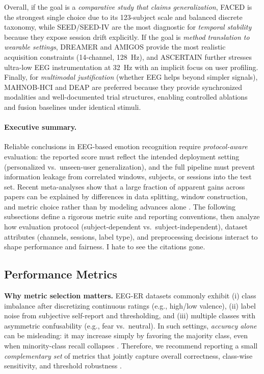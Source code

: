 \documentclass{WileyMSP-template}
\begin{document}
Overall, if the goal is a \emph{comparative study that claims generalization}, FACED is the strongest single choice due to its 123-subject scale and balanced discrete taxonomy, while SEED/SEED-IV are the most diagnostic for \emph{temporal stability} because they expose session drift explicitly. \cite{chen2023faced,seed_page,seediv_page}
If the goal is \emph{method translation to wearable settings}, DREAMER and AMIGOS provide the most realistic acquisition constraints (14-channel, 128~Hz), and ASCERTAIN further stresses ultra-low EEG instrumentation at 32~Hz with an implicit focus on user profiling. \cite{katsigiannis2018dreamer,amigos2018,subramanian2018ascertain}
Finally, for \emph{multimodal justification} (whether EEG helps beyond simpler signals), MAHNOB-HCI and DEAP are preferred because they provide synchronized modalities and well-documented trial structures, enabling controlled ablations and fusion baselines under identical stimuli. \cite{soleymani2012mahnob,koelstra2012deap}

\paragraph{Executive summary.}
Reliable conclusions in EEG-based emotion recognition require \emph{protocol-aware} evaluation: the reported score must reflect the intended deployment setting (personalized vs.\ unseen-user generalization), and the full pipeline must prevent information leakage from correlated windows, subjects, or sessions into the test set. Recent meta-analyses show that a large fraction of apparent gains across papers can be explained by differences in data splitting, window construction, and metric choice rather than by modeling advances alone \cite{kukhilava2025evaluation,li2022tutorial,PeerJCS2065}. The following subsections define a rigorous metric suite and reporting conventions, then analyze how evaluation protocol (subject-dependent vs.\ subject-independent), dataset attributes (channels, sessions, label type), and preprocessing decisions interact to shape performance and fairness.
I hate to see the citations gone.
\subsection{Performance Metrics}
\label{subsec:performance_metrics}
\textbf{Why metric selection matters.}
EEG-ER datasets commonly exhibit (i) class imbalance after discretizing continuous ratings (e.g., high/low valence), (ii) label noise from subjective self-report and thresholding, and (iii) multiple classes with asymmetric confusability (e.g., fear vs.\ neutral). In such settings, \emph{accuracy alone} can be misleading: it may increase simply by favoring the majority class, even when minority-class recall collapses \cite{li2022tutorial,PeerJCS2065}. Therefore, we recommend reporting a small \emph{complementary set} of metrics that jointly capture overall correctness, class-wise sensitivity, and threshold robustness \cite{kukhilava2025evaluation}.
\end{document}
